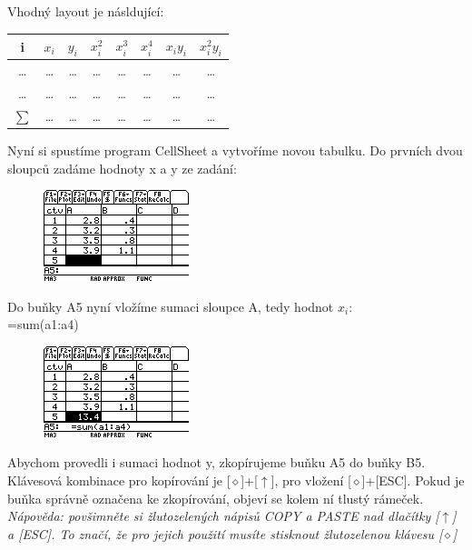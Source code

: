 \documentclass[10pt,a4paper,float]{article}
\begin{document}
Vhodný layout je násldující:

\begin{table}[H]
	\centering
	\begin{tabular}{c|c|c|c|c|c|c|c}
		i & $x_i$ & $y_i$ & $x_i^2$ & $x_i^3$ & $x_i^4$ & $x_i y_i$ & $x_i^2 y_i$ \\ \hline
		\dots & \dots & \dots & \dots & \dots & \dots & \dots & \dots \\
		\dots & \dots & \dots & \dots & \dots & \dots & \dots & \dots \\ \hline
		$\sum$ & \dots & \dots & \dots & \dots & \dots & \dots & \dots \\
	\end{tabular}
\end{table}

Nyní si spustíme program CellSheet a vytvoříme novou tabulku. Do prvních dvou sloupců zadáme hodnoty x a y ze zadání:

\begin{figure}[H]
	\centering
	\includegraphics[width=.5\textwidth]{img/CTVERCE1.PNG}
\end{figure}

\pagebreak

Do buňky A5 nyní vložíme sumaci sloupce A, tedy hodnot $x_i$:\\
=sum(a1:a4)

\begin{figure}[H]
	\centering
	\includegraphics[width=.5\textwidth]{img/CTVERCE2.PNG}
\end{figure}

Abychom provedli i sumaci hodnot y, zkopírujeme buňku A5 do buňky B5. Klávesová kombinace pro kopírování je [$\diamond$]+[$\uparrow$], pro vložení [$\diamond$]+[ESC]. Pokud je buňka správně označena ke zkopírování, objeví se kolem ní tlustý rámeček.\\
\textit{Nápověda: povšimněte si žlutozelených nápisů COPY a PASTE nad dlačítky [$\uparrow$] a [ESC]. To značí, že pro jejich použití musíte stisknout žlutozelenou klávesu [$\diamond$]}
\end{document}
